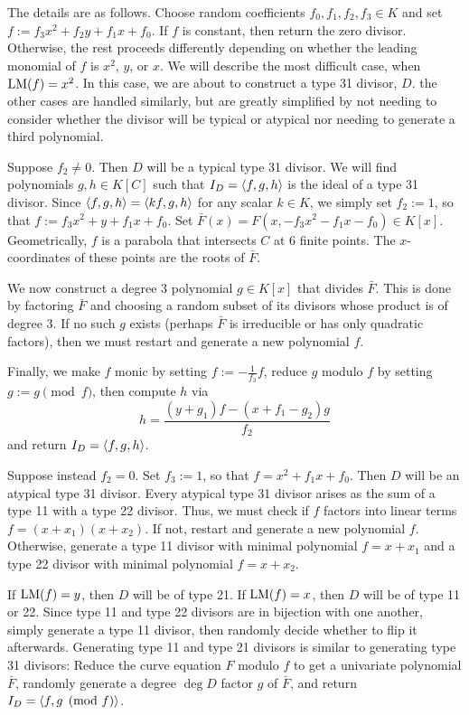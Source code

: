 The details are as follows.
Choose random coefficients $f_0, f_1, f_2, f_3 \in K$ and set $f := f_3x^2 + f_2y + f_1x + f_0$.
If $f$ is constant, then return the zero divisor.
Otherwise, the rest proceeds differently
depending on whether the leading monomial of $f$ is $x^2$, $y$, or $x$.
We will describe the most difficult case, when $\operatorname{LM}(f) = x^2$.
In this case, we are about to construct a type 31 divisor, $D$.
the other cases are handled similarly, but are greatly simplified by not needing to consider whether the divisor will be typical or atypical nor needing to generate a third polynomial.

Suppose $f_2 \neq 0$.
Then $D$ will be a typical type 31 divisor.
We will find polynomials $g, h \in K[C]$ such that $I_D = \left\langle f,g,h \right\rangle$ is the ideal of a type 31 divisor.
Since $\left\langle f,g,h \right\rangle = \left\langle kf,g,h \right\rangle$ for any scalar $k \in K$, we simply set $f_2 := 1$,
so that $f := f_3x^2 + y + f_1x + f_0$.
Set $\bar F(x) = F(x, -f_3x^2 - f_1x - f_0) \in K[x]$.
Geometrically, $f$ is a parabola that intersects $C$ at 6 finite points.
The $x$-coordinates of these points are the roots of $\bar F$.

We now construct a degree 3 polynomial $g \in K[x]$ that divides $\bar F$.
This is done by factoring $\bar F$ and choosing a random subset of its divisors whose product is of degree 3.
If no such $g$ exists (perhaps $\bar F$ is irreducible or has only quadratic factors), then we must restart and generate a new polynomial $f$.

Finally, we make $f$ monic by setting $f := - \frac 1 {f_3} f$,
reduce $g$ modulo $f$ by setting $g := g \pmod f$,
then compute $h$ via
\[ h = \frac{(y + g_1)f - (x + f_1 - g_2)g}{f_2} \]
and return $I_D = \left\langle f,g,h \right\rangle$.

Suppose instead $f_2 = 0$.
Set $f_3 := 1$, so that $f = x^2 + f_1x + f_0$.
Then $D$ will be an atypical type 31 divisor.
Every atypical type 31 divisor arises as the sum of a type 11 with a type 22 divisor.
Thus, we must check if $f$ factors into linear terms $f = (x + x_1)(x + x_2)$.
If not, restart and generate a new polynomial $f$.
Otherwise, generate a type 11 divisor with minimal polynomial $f = x + x_1$ and a type 22 divisor with minimal polynomial $f = x + x_2$.

If $\operatorname{LM}(f) = y$, then $D$ will be of type 21.
If $\operatorname{LM}(f) = x$, then $D$ will be of type 11 or 22.
Since type 11 and type 22 divisors are in bijection with one another,
simply generate a type 11 divisor, then randomly decide whether to flip it afterwards.
Generating type 11 and type 21 divisors is similar to generating type 31 divisors:
Reduce the curve equation $F$ modulo $f$ to get a univariate polynomial $\bar F$,
randomly generate a degree $\deg D$ factor $g$ of $\bar F$,
and return $I_D = \left\langle f, g \pmod f \right\rangle$.

